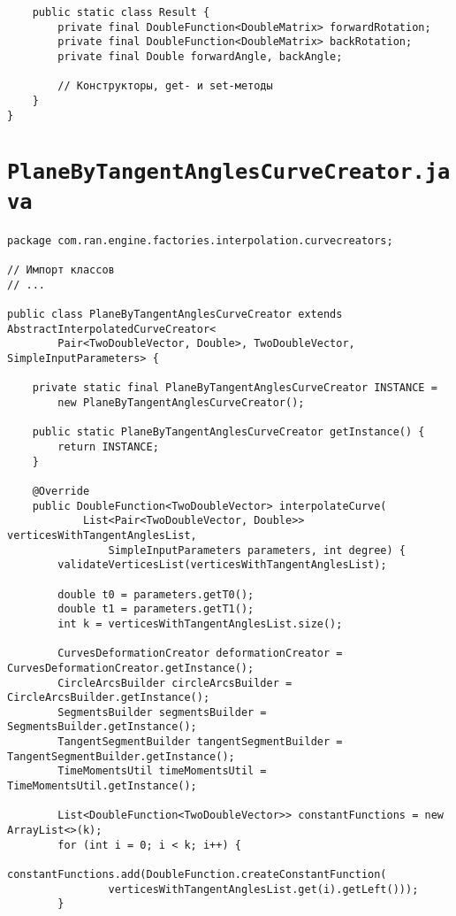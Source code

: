 \begin{verbatim}
    public static class Result {
        private final DoubleFunction<DoubleMatrix> forwardRotation;
        private final DoubleFunction<DoubleMatrix> backRotation;
        private final Double forwardAngle, backAngle;

        // Конструкторы, get- и set-методы
    }
}
\end{verbatim}

\section*{\texttt{PlaneByTangentAnglesCurveCreator.java}}
\begin{verbatim}
package com.ran.engine.factories.interpolation.curvecreators;

// Импорт классов
// ...

public class PlaneByTangentAnglesCurveCreator extends AbstractInterpolatedCurveCreator<
        Pair<TwoDoubleVector, Double>, TwoDoubleVector, SimpleInputParameters> {

    private static final PlaneByTangentAnglesCurveCreator INSTANCE =
        new PlaneByTangentAnglesCurveCreator();

    public static PlaneByTangentAnglesCurveCreator getInstance() {
        return INSTANCE;
    }

    @Override
    public DoubleFunction<TwoDoubleVector> interpolateCurve(
            List<Pair<TwoDoubleVector, Double>> verticesWithTangentAnglesList,
                SimpleInputParameters parameters, int degree) {
        validateVerticesList(verticesWithTangentAnglesList);

        double t0 = parameters.getT0();
        double t1 = parameters.getT1();
        int k = verticesWithTangentAnglesList.size();

        CurvesDeformationCreator deformationCreator = CurvesDeformationCreator.getInstance();
        CircleArcsBuilder circleArcsBuilder = CircleArcsBuilder.getInstance();
        SegmentsBuilder segmentsBuilder = SegmentsBuilder.getInstance();
        TangentSegmentBuilder tangentSegmentBuilder = TangentSegmentBuilder.getInstance();
        TimeMomentsUtil timeMomentsUtil = TimeMomentsUtil.getInstance();

        List<DoubleFunction<TwoDoubleVector>> constantFunctions = new ArrayList<>(k);
        for (int i = 0; i < k; i++) {
            constantFunctions.add(DoubleFunction.createConstantFunction(
                verticesWithTangentAnglesList.get(i).getLeft()));
        }


\end{verbatim}

